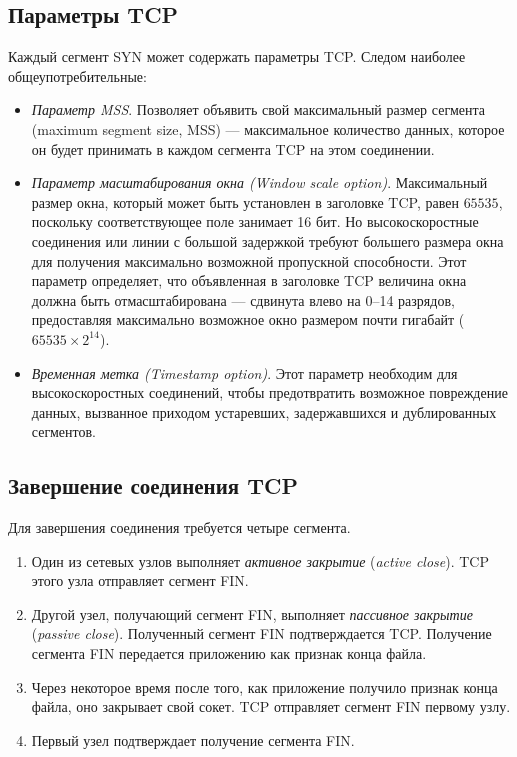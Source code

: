 \subsection{Параметры TCP}
Каждый сегмент SYN может содержать параметры TCP. Следом наиболее общеупотребительные:
\begin{itemize}
  \item \emph{Параметр MSS}. Позволяет объявить свой максимальный размер сегмента (maximum segment size, MSS) --- максимальное количество данных, которое он будет принимать в каждом сегмента TCP на этом соединении.
  \item \emph{Параметр масштабирования окна (Window scale option)}. Максимальный размер окна, который может быть установлен в заголовке TCP, равен $65535$, поскольку соответствующее поле занимает 16 бит. Но высокоскоростные соединения или линии с большой задержкой требуют большего размера окна для получения максимально возможной пропускной способности. Этот параметр определяет, что объявленная в заголовке TCP величина окна должна быть отмасштабирована --- сдвинута влево на 0--14 разрядов, предоставляя максимально возможное окно размером почти гигабайт ($65535 \times 2^{14}$).
  \item \emph{Временная метка (Timestamp option)}. Этот параметр необходим для высокоскоростных соединений, чтобы предотвратить возможное повреждение данных, вызванное приходом устаревших, задержавшихся и дублированных сегментов.
\end{itemize}

\subsection{Завершение соединения TCP}
Для завершения соединения требуется четыре сегмента.

\begin{enumerate}
  \item Один из сетевых узлов выполняет \emph{активное закрытие} (\emph{active close}). TCP этого узла отправляет сегмент FIN.
  \item Другой узел, получающий сегмент FIN, выполняет \emph{пассивное закрытие} (\emph{passive close}). Полученный сегмент FIN подтверждается TCP. Получение сегмента FIN передается приложению как признак конца файла.
  \item Через некоторое время после того, как приложение получило признак конца файла, оно закрывает свой сокет. TCP отправляет сегмент FIN первому узлу.
  \item Первый узел подтверждает получение сегмента FIN.
\end{enumerate}

